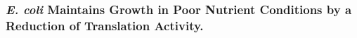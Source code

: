 \subsubsection{\textit{E. coli} Maintains Growth in Poor Nutrient Conditions by a
Reduction of Translation Activity.}
%
%
%
%
%
%
%
%
%
%
%
%
%
%
%
%
%
